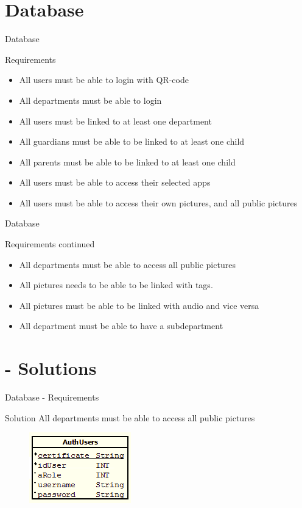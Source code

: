 \section{Database}
\begin{frame}{Database}
\pause
    \begin{block}{Requirements}
        \begin{itemize}
					\pause \item All users must be able to login with QR-code
					\pause \item All departments must be able to login
					\pause \item All users must be linked to at least one department
					\pause \item All guardians must be able to be linked to at least one child
					\pause \item All parents must be able to be linked to at least one child
					\pause \item All users must be able to access their selected apps
					\pause \item All users must be able to access their own pictures, and all public pictures
				\end{itemize}
    \end{block}
\end{frame}
\begin{frame}{Database}
    \begin{block}{Requirements continued}
        \begin{itemize}
					\pause \item All departments must be able to access all public pictures
					\pause \item All pictures needs to be able to be linked with tags.
					\pause \item All pictures must be able to be linked with audio and vice versa
					\pause \item All department must be able to have a subdepartment
				\end{itemize}
    \end{block}
\end{frame}

\section{ - Solutions}
\begin{frame}{Database - Requirements}
    \begin{block}{Solution}
					All departments must be able to access all public pictures
					
\begin{figure}[h]
	\centering
		\includegraphics{Img/DatabaseQR.png}
\end{figure}

    \end{block}
\end{frame}

